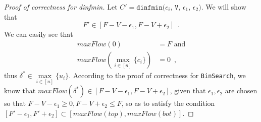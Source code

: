 \begin{proof}[Proof of correctness for dinfmin]
  Let $C' = \texttt{dinfmin(}c_i\texttt{, V, } \epsilon_1\texttt{, } \epsilon_2\texttt{)}$. We will show that
  \begin{equation*}
    F' \in [F - V - \epsilon_1, F - V + \epsilon_2] \enspace.
  \end{equation*}
  We can easily see that
  \begin{align*}
    maxFlow\left(0\right) &= F \mbox{ and} \\
    maxFlow\left(\max\limits_{i \in [n]}\{c_i\}\right) &= 0 \enspace,
  \end{align*}
  thus $\delta^* \in
  \max\limits_{i \in [n]}\{u_i\}$. According to the proof of correctness for \texttt{BinSearch}, we know that
  $maxFlow\left(\delta^*\right) \in \left[F - V - \epsilon_1, F - V + \epsilon_2\right]$, given that
  $\epsilon_1, \epsilon_2$ are chosen so that $F - V - \epsilon_1 \geq 0, F - V + \epsilon_2 \leq F$, so as to satisfy
  the condition $\left[F' - \epsilon_1, F' + \epsilon_2\right] \subset \left[maxFlow\left(top\right),
  maxFlow\left(bot\right)\right]$.
\end{proof}
